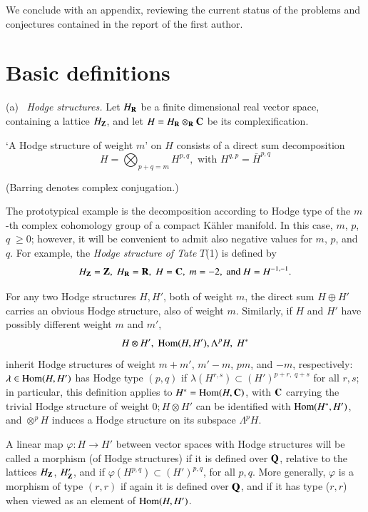 We conclude with an appendix, reviewing the current status of the problems and conjectures contained in the report \cite{art4-key21} of the first author.

\section{Basic definitions}\label{art4-sec1}
(a)~ \textit{Hodge structures.} Let $H_{\mathbf{R}}$ be a finite dimensional real vector space, containing a lattice $H_{\mathbf{Z}}$, and let $H=H_{\mathbf{R}} \otimes_{\mathbf{R}} \mathbf{C}$ be its complexification.

\begin{definition}\label{art4-def1.1}
`A Hodge structure of weight $m$' on $H$ consists of a direct sum decomposition
$$
H = \bigotimes_{p+q=m} H^{p,q}, \text{ with } H^{q,p} = \bar{H}^{p,q}
$$
\end{definition}

(Barring denotes complex conjugation.)

\begin{remark*}
The prototypical example is the decomposition according to Hodge type of the $m$-th complex cohomology group of a compact K\"ahler manifold. In this case, $m$, $p$, $q \;\geqslant 0$; however, it will be convenient to admit also negative values for $m$, $p$, and $q$. For example, the \textit{Hodge structure of Tate} $T$(1) is defined by
$$
H_{\mathbf{Z}} =\mathbf{Z}, \; H_{\mathbf{R}} = \mathbf{R}, \; H = \mathbf{C}, \; m= -2, \text{ and } H = H^{-1,-1}.
$$

For any two Hodge structures $H, H'$, both of weight $m$, the direct sum $H\oplus H'$ carries an obvious Hodge structure, also of weight $m$. Similarly, if $H$ and $H'$ have possibly different weight $m$ and $m'$,
$$
H\otimes H', \; \operatorname{Hom} (H, H'), \Lambda^p H, \; H^\ast
$$
inherit Hodge structures of weight $m+ m'$, $m'-m$, $pm$, and $-m$, respectively: $\lambda \in \operatorname{Hom}(H, H')$ has Hodge type $(p,q)$ if $\lambda(H^{r,s}) \subset (H')^{p+r, \; q+s}$ for all $r, s$; in particular, this definition applies to $H^\ast = \operatorname{Hom} (H, \mathbf{C})$, with $\mathbf{C}$ carrying the trivial Hodge structure of weight $0; H \otimes H'$ can be identified with $\operatorname{Hom} (H^\ast, H')$, and $\otimes^pH$ induces a Hodge structure on its subspace $\Lambda^p H$.
 \end{remark*}

\begin{definition}\label{art4-def1.2}
A linear map $\varphi: H \to H'$ between vector spaces with Hodge structures will be called a morphism (of Hodge structures) if it is defined over $\mathbf{Q}$, relative to the lattices $H_{\mathbf{Z}}$, $H'_{\mathbf{Z}}$, and if $\varphi (H^{p,q}) \subset (H')^{p,q}$, for all $p,q$. More generally, $\varphi$ is a morphism of type $(r,r)$ if again it is defined over $\mathbf{Q}$, and if it has type ($r, r$) when viewed as an element of $\operatorname{Hom}(H, H')$.
\end{definition}

